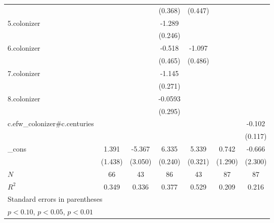 {\begin{tabular}{l*{6}{c}}
            &                     &                     &     (0.368)         &     (0.447)         &                     &                     \\
[1em]
5.colonizer &                     &                     &      -1.289\sym{***}&                     &                     &                     \\
            &                     &                     &     (0.246)         &                     &                     &                     \\
[1em]
6.colonizer &                     &                     &      -0.518         &      -1.097\sym{**} &                     &                     \\
            &                     &                     &     (0.465)         &     (0.486)         &                     &                     \\
[1em]
7.colonizer &                     &                     &      -1.145\sym{***}&                     &                     &                     \\
            &                     &                     &     (0.271)         &                     &                     &                     \\
[1em]
8.colonizer &                     &                     &     -0.0593         &                     &                     &                     \\
            &                     &                     &     (0.295)         &                     &                     &                     \\
[1em]
c.efw\_colonizer#c.centuries&                     &                     &                     &                     &                     &      -0.102         \\
            &                     &                     &                     &                     &                     &     (0.117)         \\
[1em]
\_cons      &       1.391         &      -5.367\sym{*}  &       6.335\sym{***}&       5.339\sym{***}&       0.742         &      -0.666         \\
            &     (1.438)         &     (3.050)         &     (0.240)         &     (0.321)         &     (1.290)         &     (2.300)         \\
\hline
\(N\)       &          66         &          43         &          86         &          43         &          87         &          87         \\
\(R^{2}\)   &       0.349         &       0.336         &       0.377         &       0.529         &       0.209         &       0.216         \\
\hline\hline
\multicolumn{7}{l}{\footnotesize Standard errors in parentheses}\\
\multicolumn{7}{l}{\footnotesize \sym{*} \(p<0.10\), \sym{**} \(p<0.05\), \sym{***} \(p<0.01\)}\\
\end{tabular}
}
